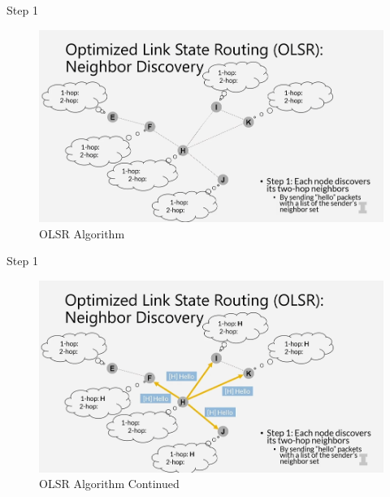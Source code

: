 \documentclass[11pt]{beamer}              %
\begin{document}
\begin{frame}{Step 1}

    \begin{figure}
        \centering
        \includegraphics[width=\textwidth]{figures/olsr1.png}
        \caption{OLSR Algorithm \cite{coursera}}
    \end{figure}    
    
\end{frame}

\begin{frame}{Step 1}

    \begin{figure}
        \centering
        \includegraphics[width=\textwidth]{figures/olsr2.png}
        \caption{OLSR Algorithm Continued \cite{coursera}}
    \end{figure}    
    
\end{frame}
\end{document}
